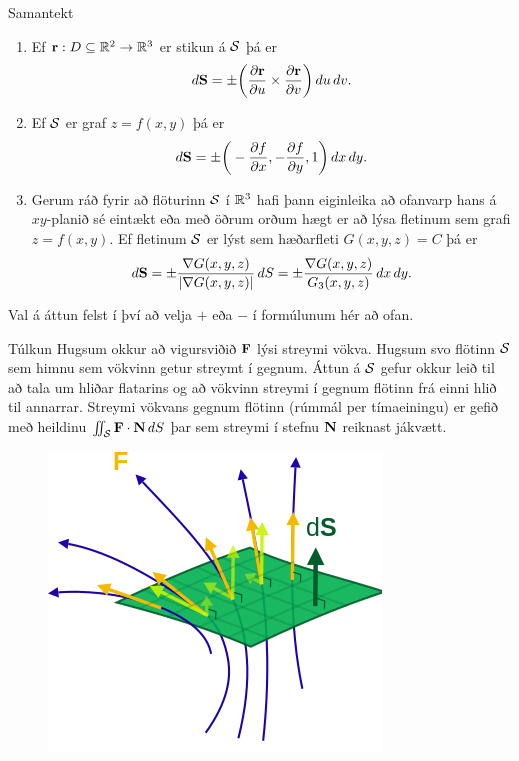 \begin{frame}{} 

\begin {block}{Samantekt \rtask{}}
  
\begin{enumerate}
\item Ef $\mbox{${\bf r}$}:D\subseteq{\mathbb R}^2\rightarrow {\mathbb R}^3$ er stikun á $\cal S$ þá
  er $$d\mbox{${\bf S}$}=\pm \bigg(\frac{\partial \mbox{${\bf r}$}}{\partial u}\times\frac{\partial
  \mbox{${\bf r}$}}{\partial v}\bigg)\,du\,dv.$$
\item Ef $\cal S$ er graf $z=f(x,y)$ þá er 
$$d\mbox{${\bf S}$}=\pm\bigg(-\frac{\partial f}{\partial x},-\frac{\partial
  f}{\partial y},1\bigg)\,dx\,dy.$$
\item Gerum ráð fyrir að flöturinn $\cal S$ í ${\mathbb R}^3$ hafi þann eiginleika að
  ofanvarp hans á $xy$-planið sé eintækt eða með öðrum orðum hægt er
  að lýsa fletinum sem grafi $z=f(x,y)$.
Ef fletinum $\cal S$ er lýst sem 
hæðarfleti $G(x,y,z)=C$ þá er  
$$d\mbox{${\bf S}$}=\pm\frac{\nabla G(x,y,z)}{|\nabla G(x,y,z)|}\,dS=
\pm\frac{\nabla G(x,y,z)}{G_3(x,y,z)}\,dx\,dy.$$
\end{enumerate}
Val á áttun felst í því að velja $+$ eða $-$ í formúlunum hér að
ofan.  

\end{block}

\end{frame}



\begin{frame}{} 

\begin {block}{Túlkun \rtask{}}
 Hugsum okkur að vigursviðið $\mbox{${\bf F}$}$ lýsi streymi
vökva.  Hugsum svo flötinn $\cal S$ sem himnu sem vökvinn getur
streymt í gegnum.  Áttun á $\cal S$ gefur okkur leið til að tala um
hliðar flatarins og að vökvinn streymi í gegnum flötinn frá
einni hlið til annarrar.  Streymi vökvans gegnum flötinn (rúmmál per
tímaeiningu) er gefið með heildinu $\int\!\!\!\int_{\cal S} \mbox{${\bf F}$}\cdot\mbox{${\bf N}$}\,dS$
  þar sem streymi í stefnu $\mbox{${\bf N}$}$ reiknast jákvætt.
\end{block}
\begin {figure}[h!]
 \centering
            \includegraphics[width=0.45\linewidth]{flux.png}
            \caption*{}
\end {figure}
\end{frame}


